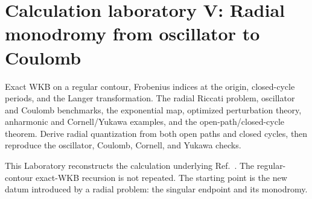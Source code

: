 \section{Calculation laboratory V: Radial monodromy from oscillator to Coulomb}
\label{lab:2510_11766}

\calculationroute
  {Exact WKB on a regular contour, Frobenius indices at the origin, closed-cycle periods, and the Langer transformation.}
  {The radial Riccati problem, oscillator and Coulomb benchmarks, the exponential map, optimized perturbation theory, anharmonic and Cornell/Yukawa examples, and the open-path/closed-cycle theorem.}
  {Derive radial quantization from both open paths and closed cycles, then reproduce the oscillator, Coulomb, Cornell, and Yukawa checks.}

This Laboratory reconstructs the calculation underlying
Ref.~\cite{Morikawa:2025ezl}.  The regular-contour exact-WKB recursion is not
repeated.  The starting point is the new datum introduced by a radial problem:
the singular endpoint and its monodromy.


